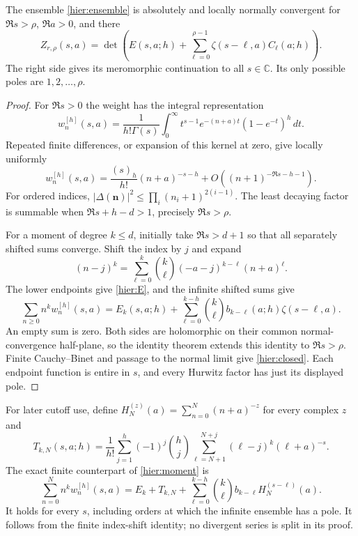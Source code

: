 \begin{theorem}
\label{hier:closure}
The ensemble \eqref{hier:ensemble} is absolutely and locally normally
convergent for $\Re s>\rho$, $\Re a>0$, and there
\begin{equation}\label{hier:closed}
 \boxed{\displaystyle
 Z_{r,\rho}(s,a)=\det\left(
 E(s,a;h)+\sum_{\ell=0}^{\rho-1}
                    \zeta(s-\ell,a)C_\ell(a;h)\right).}
\end{equation}
The right side gives its meromorphic continuation to all $s\in\mathbb C$.
Its only possible poles are $1,2,\ldots,\rho$.
\end{theorem}
\begin{proof}
For $\Re s>0$ the weight has the integral representation
\begin{equation}\label{hier:laplace}
 w_n^{[h]}(s,a)=\frac1{h!\Gamma(s)}
 \int_0^\infty t^{s-1}e^{-(n+a)t}(1-e^{-t})^h\,dt.
\end{equation}
Repeated finite differences, or expansion of this kernel at zero,
give locally uniformly
\begin{equation}\label{hier:decay}
 w_n^{[h]}(s,a)=\frac{(s)_h}{h!}(n+a)^{-s-h}
                     +O((n+1)^{-\Re s-h-1}).
\end{equation}
For ordered indices, $|\Delta(\boldsymbol n)|^2\le
\prod_i(n_i+1)^{2(i-1)}$.  The least decaying factor is summable
when $\Re s+h-d>1$, precisely $\Re s>\rho$.

For a moment of degree $k\le d$, initially take $\Re s>d+1$ so
that all separately shifted sums converge.  Shift the index by $j$
and expand
\[
 (n-j)^k=\sum_{\ell=0}^k\binom k\ell
                      (-a-j)^{k-\ell}(n+a)^\ell.
\]
The lower endpoints give \eqref{hier:E}, and the infinite shifted
sums give
\begin{equation}\label{hier:moment}
 \sum_{n\ge0}n^k w_n^{[h]}(s,a)
 =E_k(s,a;h)+\sum_{\ell=0}^{k-h}
     \binom k\ell b_{k-\ell}(a;h)\zeta(s-\ell,a).
\end{equation}
An empty sum is zero.  Both sides are holomorphic on their common
normal-convergence half-plane, so the identity theorem extends this
identity to $\Re s>\rho$.  Finite Cauchy--Binet and passage to the
normal limit give \eqref{hier:closed}.  Each endpoint function is
entire in $s$, and every Hurwitz factor has just its displayed pole.
\end{proof}

For later cutoff use, define
$H_N^{(z)}(a)=\sum_{n=0}^N(n+a)^{-z}$ for every complex $z$ and
\begin{equation}\label{hier:upper}
 T_{k,N}(s,a;h)=\frac1{h!}\sum_{j=1}^h(-1)^j\binom hj
       \sum_{\ell=N+1}^{N+j}(\ell-j)^k(\ell+a)^{-s}.
\end{equation}
The exact finite counterpart of \eqref{hier:moment} is
\begin{equation}\label{hier:finite-moment}
 \sum_{n=0}^N n^k w_n^{[h]}(s,a)
 = E_k+T_{k,N}+
   \sum_{\ell=0}^{k-h}\binom k\ell b_{k-\ell}
                                     H_N^{(s-\ell)}(a).
\end{equation}
It holds for every $s$, including orders at which the infinite
ensemble has a pole.  It follows from the finite index-shift identity;
no divergent series is split in its proof.

